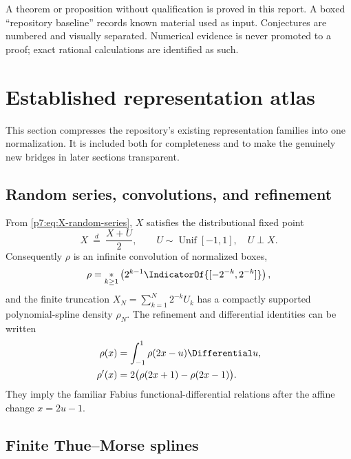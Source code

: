 \documentclass[11pt]{article}
\theoremstyle{definition}
\theoremstyle{remark}
\begin{document}
A theorem or proposition without qualification is proved in this report. A boxed
``repository baseline'' records known material used as input. Conjectures are numbered and
visually separated. Numerical evidence is never promoted to a proof; exact rational
calculations are identified as such.

\section{Established representation atlas}
\label{p7:sec:baseline}

This section compresses the repository's existing representation families into one
normalization. It is included both for completeness and to make the genuinely new bridges
in later sections transparent.

\subsection{Random series, convolutions, and refinement}

From \eqref{p7:eq:X-random-series}, \(X\) satisfies the distributional fixed point
\begin{equation}
 X\ \stackrel d=\ \frac{X+U}{2},
 \qquad U\sim\operatorname{Unif}[-1,1],\quad U\perp X.
 \label{p7:eq:distribution-fixed-point}
\end{equation}
Consequently \(\rho\) is an infinite convolution of normalized boxes,
\begin{equation}
 \rho=\underset{k\ge1}{*}\left(2^{k-1}\IndicatorOf{[-2^{-k},2^{-k}]}\right),
 \label{p7:eq:infinite-convolution}
\end{equation}
and the finite truncation \(X_N=\sum_{k=1}^{N}2^{-k}U_k\) has a compactly supported
polynomial-spline density \(\rho_N\). The refinement and differential identities can be
written
\begin{align}
 \rho(x)&=\int_{-1}^{1}\rho(2x-u)\Differential u,
 \label{p7:eq:rho-refinement}\\
 \rho'(x)&=2\bigl(\rho(2x+1)-\rho(2x-1)\bigr).
 \label{p7:eq:rho-differential}
\end{align}
They imply the familiar Fabius functional-differential relations after the affine change
\(x=2u-1\).

\subsection{Finite Thue--Morse splines}
\end{document}
